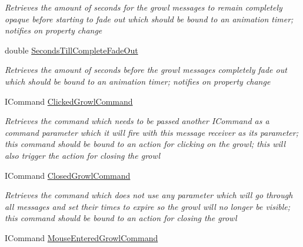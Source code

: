 \begin{DoxyCompactItemize}
\begin{DoxyCompactList}\small\item\em Retrieves the amount of seconds for the growl messages to remain completely opaque before starting to fade out which should be bound to an animation timer; notifies on property change \end{DoxyCompactList}\item 
double \hyperlink{class_cloud_api_public_1_1_event_message_receiver_1_1_event_message_receiver_acbc67b358faa248a4328980ba6fc958f}{Seconds\-Till\-Complete\-Fade\-Out}
\begin{DoxyCompactList}\small\item\em Retrieves the amount of seconds before the growl messages completely fade out which should be bound to an animation timer; notifies on property change \end{DoxyCompactList}\item 
I\-Command \hyperlink{class_cloud_api_public_1_1_event_message_receiver_1_1_event_message_receiver_afce60beabd6d3468cefb6366df1b1a53}{Clicked\-Growl\-Command}
\begin{DoxyCompactList}\small\item\em Retrieves the command which needs to be passed another I\-Command as a command parameter which it will fire with this message receiver as its parameter; this command should be bound to an action for clicking on the growl; this will also trigger the action for closing the growl \end{DoxyCompactList}\item 
I\-Command \hyperlink{class_cloud_api_public_1_1_event_message_receiver_1_1_event_message_receiver_abd28c2b693c427cd686a5b79e07f99de}{Closed\-Growl\-Command}
\begin{DoxyCompactList}\small\item\em Retrieves the command which does not use any parameter which will go through all messages and set their times to expire so the growl will no longer be visible; this command should be bound to an action for closing the growl \end{DoxyCompactList}\item 
I\-Command \hyperlink{class_cloud_api_public_1_1_event_message_receiver_1_1_event_message_receiver_a468875e6cf137136ec34e64e2ead14b9}{Mouse\-Entered\-Growl\-Command}

\end{DoxyCompactItemize}
